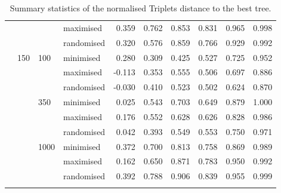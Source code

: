 \begin{longtable}{llllrrrrrr}
   &  &  & maximised & 0.359 & 0.762 & 0.853 & 0.831 & 0.965 & 0.998 \\ 
   &  &  & randomised & 0.320 & 0.576 & 0.859 & 0.766 & 0.929 & 0.992 \\ 
   & 150 & 100 & minimised & 0.280 & 0.309 & 0.425 & 0.527 & 0.725 & 0.952 \\ 
   &  &  & maximised & -0.113 & 0.353 & 0.555 & 0.506 & 0.697 & 0.886 \\ 
   &  &  & randomised & -0.030 & 0.410 & 0.523 & 0.502 & 0.624 & 0.870 \\ 
   &  & 350 & minimised & 0.025 & 0.543 & 0.703 & 0.649 & 0.879 & 1.000 \\ 
   &  &  & maximised & 0.176 & 0.552 & 0.628 & 0.626 & 0.828 & 0.986 \\ 
   &  &  & randomised & 0.042 & 0.393 & 0.549 & 0.553 & 0.750 & 0.971 \\ 
   &  & 1000 & minimised & 0.372 & 0.700 & 0.813 & 0.758 & 0.869 & 0.989 \\ 
   &  &  & maximised & 0.162 & 0.650 & 0.871 & 0.783 & 0.950 & 0.992 \\ 
   &  &  & randomised & 0.392 & 0.788 & 0.906 & 0.839 & 0.955 & 0.999 \\ 
   \hline
\hline
\caption{Summary statistics of the normalised Triplets distance to the best tree.} 
\label{Full_Tab_SummaryTrbest}
\end{longtable}
